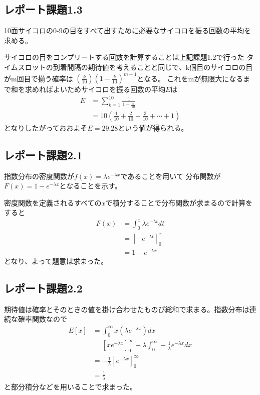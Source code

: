 \documentclass[a4paper,11pt,dvipdfmx]{jsarticle}
\begin{document}
\subsection*{レポート課題1.3}
10面サイコロの0-9の目をすべて出すために必要なサイコロを振る回数の平均を求める。

サイコロの目をコンプリートする回数を計算することは上記課題1.2で行った
タイムスロットの到着間隔の期待値を考えることと同じで、k個目のサイコロの目がm回目で揃う確率は
$(\frac{k}{10})(1-\frac{k}{10})^{m-1}$となる。
これをmが無限大になるまで和を求めればよいためサイコロを振る回数の平均$E$は
\begin{align}
    E &= \sum_{k=1}^{10}\frac{1}{1-\frac{k}{10}}\\
      &= 10(\frac{1}{10}+\frac{2}{10}+\frac{3}{10}+\cdots+1)
\end{align}
となりしたがっておおよそ$E=29.28$という値が得られる。

\subsection{レポート課題2.1}
指数分布の密度関数が$f(x)=\lambda e^{-\lambda x}$であることを用いて
分布関数が$F(x)=1-e^{-\lambda x}$となることを示す。

密度関数を定義されるすべての$x$で積分することで分布関数が求まるので計算をすると
\begin{align}
    F(x) &= \int_{0}^{x}\lambda e^{-\lambda t}dt \\
         &= \left[-e^{-\lambda t}\right]_{0}^{x} \\
         &= 1 - e^{-\lambda x}
\end{align}
となり、よって題意は求まった。

\subsection{レポート課題2.2}
期待値は確率とそのときの値を掛け合わせたものび総和で求まる。指数分布は連続な確率関数なので
\begin{align}
    E[x] &= \int_{0}^{\infty}x(\lambda e^{-\lambda x})dx \\
         &= \left[xe^{-\lambda x}\right]_{0}^{\infty} - \lambda \int_{0}^{\infty} -\frac{1}{\lambda} e^{-\lambda x} dx \\
         &= -\frac{1}{\lambda} \left[e^{-\lambda x}\right]_{0}^{\infty} \\
         &= \frac{1}{\lambda}
\end{align}
と部分積分などを用いることで求まった。
\end{document}
